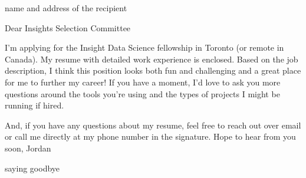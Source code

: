 \documentclass[10pt,letterpaper]{letter}
\begin{document}
 
\begin{letter}{name and address of the recipient} 
\opening{Dear Insights Selection Committee} 
 
I'm applying for the Insight Data Science fellowship in Toronto (or remote in Canada).
My resume with detailed work experience is enclosed. Based on the job description, I think this position looks both fun and challenging and a great place for me to further my career! If you have a moment, I'd love to ask you more questions around the tools you're using and the types of projects I might be running if hired.

And, if you have any questions about my resume, feel free to reach out over email or call me directly at my phone number in the signature.
Hope to hear from you soon,
Jordan
 

\closing{saying goodbye} 
\end{letter} 
\end{document}
